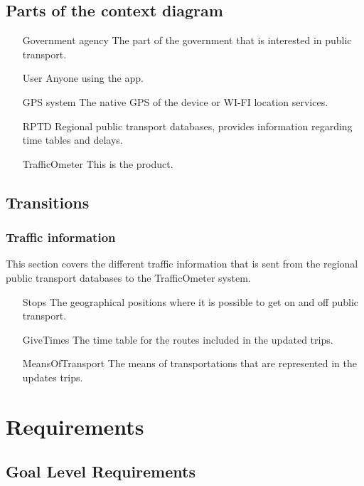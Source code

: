 \documentclass[a4paper]{article}
\begin{document}
		\subsection{Parts of the context diagram} %
		\label{sub:parts_of_the_context_diagram}
		\begin{itemize}
			\item[Government agency] The part of the government that is interested in public transport. 
			\item[User] Anyone using the app.
			\item[GPS system] The native GPS of the device or WI-FI location services.
			\item[RPTD] Regional public transport databases, provides information regarding time tables and delays.
			\item[TrafficOmeter] This is the product.
		\end{itemize}
		\subsection{Transitions} %
		\label{sub:transitions}
			\subsubsection{Traffic information} %
			\label{ssub:traffic_information}
			This section covers the different traffic information that is sent from the regional public transport databases to the TrafficOmeter system.
			\begin{itemize}
				\item[Stops] The geographical positions where it is possible to get on and off public transport.
				\item[GiveTimes] The time table for the routes included in the updated trips.
				\item[MeansOfTransport] The means of transportations that are represented in the updates trips.
			\end{itemize}
		
	
	
	\section{Requirements}
		\subsection{Goal Level Requirements}
			
\end{document}
